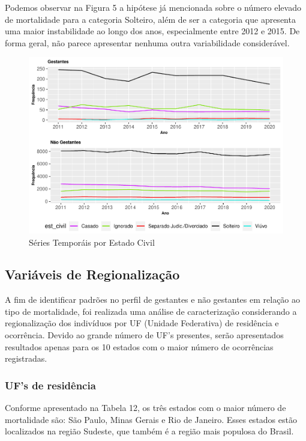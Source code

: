 \documentclass[
]{article}
\begin{document}
Podemos observar na Figura 5 a hipótese já mencionada sobre o número
elevado de mortalidade para a categoria Solteiro, além de ser a
categoria que apresenta uma maior instabilidade ao longo dos anos,
especialmente entre 2012 e 2015. De forma geral, não parece apresentar
nenhuma outra variabilidade considerável.

\begin{figure}
\centering
\includegraphics{RelatorioV01_files/figure-latex/unnamed-chunk-10-1.pdf}
\caption{Séries Temporáis por Estado Civil}
\end{figure}

\hypertarget{variuxe1veis-de-regionalizauxe7uxe3o}{%
\subsection{Variáveis de
Regionalização}\label{variuxe1veis-de-regionalizauxe7uxe3o}}

A fim de identificar padrões no perfil de gestantes e não gestantes em
relação ao tipo de mortalidade, foi realizada uma análise de
caracterização considerando a regionalização dos indivíduos por UF
(Unidade Federativa) de residência e ocorrência. Devido ao grande número
de UF's presentes, serão apresentados resultados apenas para os 10
estados com o maior número de ocorrências registradas.

\hypertarget{ufs-de-residuxeancia}{%
\subsubsection{UF's de residência}\label{ufs-de-residuxeancia}}

Conforme apresentado na Tabela 12, os três estados com o maior número de
mortalidade são: São Paulo, Minas Gerais e Rio de Janeiro. Esses estados
estão localizados na região Sudeste, que também é a região mais populosa
do Brasil.
\end{document}
